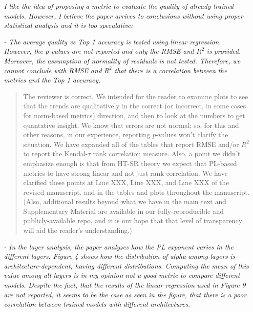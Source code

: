\documentclass[11pt]{article}
\begin{document}
\noindent
\emph{%
I like the idea of proposing a metric to evaluate the quality of already trained models. 
However, I believe the paper arrives to conclusions without using proper statistical analysis and it is too speculative:
}

\noindent
\emph{%
- The average quality vs Top 1 accuracy is tested using linear regression. However, the p-values are not reported and only the RMSE and $R^2$ is provided. Moreover, the assumption of normality of residuals is not tested. Therefore, we cannot conclude with RMSE and $R^2$ that there is a correlation between the metrics and the Top 1 accuracy.
}

\begin{quote}
The reviewer is correct.  
We intended for the reader to examine plots to see that the trends are qualitatively in the correct (or incorrect, in some cases for norm-based metrics) direction, and then to look at the numbers to get quantative insight.
We know that errors are not normal; so, for this and other reasons, in our experience, reporting $p$-values won't clarify the situation.
We have expanded all of the tables that report RMSE and/or $R^2$ to report the Kendal-$\tau$ rank correlation measure.
Also, a point we didn't emphasize enough is that from HT-SR theory we expect that PL-based metrics to have strong linear and not just rank correlation.
We have clarified these points at Line XXX, Line XXX, and Line XXX of the revised manuscript, and in the tables and plots throughout the manuscript.
(Also, additional results beyond what we have in the main text and Supplementary Material are available in our fully-reproducible and publicly-available repo, and it is our hope that that level of transparency will aid the reader's understanding.)
\end{quote}

\noindent
\emph{%
- In the layer analysis, the paper analyzes how the PL exponent varies in the different layers. Figure 4 shows how the distribution of alpha among layers is architecture-dependent, having different distributions. Computing the mean of this value among all layers is in my opinion not a good metric to compare different models. Despite the fact, that the results of the linear regression used in Figure 9 are not reported, it seems to be the case as seen in the figure, that there is a poor correlation between trained models with different architectures.
}
\end{document}
